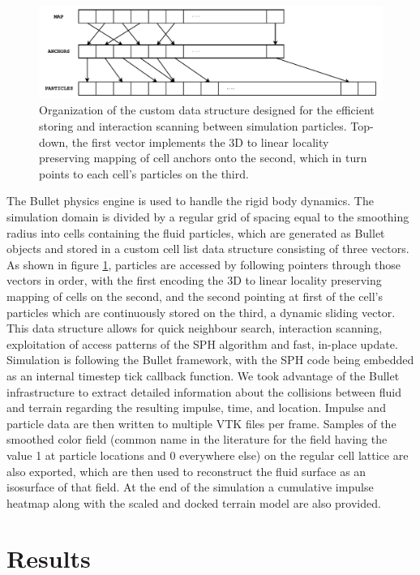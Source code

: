 \documentclass{llncs}
\begin{document}
\begin{figure}
  \includegraphics[width=\textwidth]{../report/figures/lp-grid.pdf}
  \caption{Organization of the custom data structure designed for the efficient storing
    and interaction scanning between simulation particles. Top-down, the first vector
    implements the 3D to linear locality preserving mapping of cell anchors onto the
    second, which in turn points to each cell's particles on the third.}
  \label{fig:lp-grid}
\end{figure}

The Bullet physics engine is used to handle the rigid body dynamics. The simulation domain
is divided by a regular grid of spacing equal to the smoothing radius into cells
containing the fluid particles, which are generated as Bullet objects and stored in a
custom cell list data structure consisting of three vectors. As shown in figure
\ref{fig:lp-grid}, particles are accessed by following pointers through those vectors in
order, with the first encoding the 3D to linear locality preserving mapping of cells on
the second, and the second pointing at first of the cell's particles which are
continuously stored on the third, a dynamic sliding vector. This data structure allows for
quick neighbour search, interaction scanning, exploitation of access patterns of the SPH
algorithm and fast, in-place update. Simulation is following the Bullet framework, with
the SPH code being embedded as an internal timestep tick callback function. We took
advantage of the Bullet infrastructure to extract detailed information about the
collisions between fluid and terrain regarding the resulting impulse, time, and
location. Impulse and particle data are then written to multiple VTK files per
frame. Samples of the smoothed color field (common name in the literature for the field
having the value 1 at particle locations and 0 everywhere else) on the regular cell
lattice are also exported, which are then used to reconstruct the fluid surface as an
isosurface of that field. At the end of the simulation a cumulative impulse heatmap along
with the scaled and docked terrain model are also provided.

\section{Results}
\end{document}
